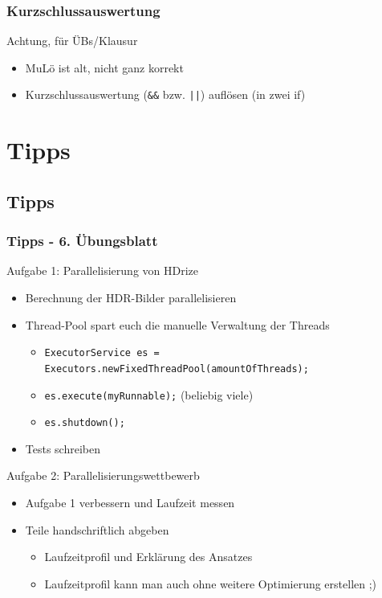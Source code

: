 \documentclass[18pt]{beamer}
\begin{document}
	\begin{frame}
		\frametitle{Kurzschlussauswertung}
		\begin{alertblock}{Achtung, für ÜBs/Klausur}
			\begin{itemize}
				\item MuLö ist alt, nicht ganz korrekt
				\item Kurzschlussauswertung (\texttt{\&\&} bzw. \texttt{||}) auflösen (in zwei if)
			\end{itemize}
		\end{alertblock}
	\end{frame}


\section{Tipps}
	\subsection{Tipps}
	\begin{frame}
		\frametitle{Tipps - 6. Übungsblatt}

		\begin{exampleblock}{Aufgabe 1: Parallelisierung von HDrize} 
			\begin{itemize}
				\item Berechnung der HDR-Bilder parallelisieren \pause
				\item Thread-Pool spart euch die manuelle Verwaltung der Threads
				\begin{itemize}
					\item \texttt{ExecutorService es = Executors.newFixedThreadPool(amountOfThreads);}
					\item \texttt{es.execute(myRunnable);} (beliebig viele)
					\item \texttt{es.shutdown();}
				\end{itemize} \pause
				\item Tests schreiben
			\end{itemize}
		\end{exampleblock}
		\pause
		\begin{exampleblock}{Aufgabe 2: Parallelisierungswettbewerb}
			\begin{itemize}
				\item Aufgabe 1 verbessern und Laufzeit messen
				\item Teile handschriftlich abgeben
				\begin{itemize}
					\item Laufzeitprofil und Erklärung des Ansatzes
					\item Laufzeitprofil kann man auch ohne weitere Optimierung erstellen ;)
				\end{itemize}
			\end{itemize}
		\end{exampleblock}
	\end{frame}
\end{document}

